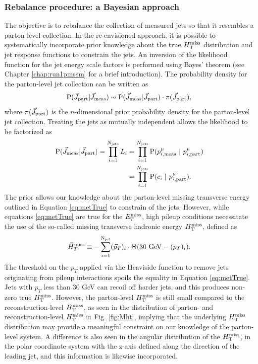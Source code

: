 \subsubsection{Rebalance procedure: a Bayesian approach}
The objective is to rebalance the collection of measured jets so that it resembles a parton-level collection. In the re-envisioned approach,  it is possible to systematically  incorporate prior knowledge about the true $H_{\text{T}}^{\rm miss}$ distribution and jet response functions to constrain the jets.  An inversion of the likelihood function for the jet energy scale factors is performed using Bayes' theorem (see Chapter \ref{chap:run1pmssm} for a brief introduction). The probability density for the parton-level jet collection can be written as
\begin{equation}
{\rm P}(\vec{J}_{\rm part}|\vec{J}_{\rm meas}) \sim {\rm P}(\vec{J}_{\rm meas}|\vec{J}_{\rm part})\cdot \pi(\vec{J}_{\rm part}),
\label{eq:posterior1}
\end{equation}
where $\pi(\vec{J}_{\rm part})$ is the $n$-dimensional prior probability density for the parton-level jet collection.
Treating the jets as mutually independent allows the likelihood to be factorized as
\begin{align}
\begin{split}
{\rm P}(\vec{J}_{\rm meas}|\vec{J}_{\rm part}) = \prod_{i=1}^{N_{\rm jets}}L_{i} &= \prod_{i=1}^{N_{\rm jets}}{\rm P}(p^{\mu}_{i,\rm meas}\ |\ p^{\mu}_{i,\rm part})\\
&=\prod_{i=1}^{N_{\rm jets}}{\rm P}(c_i\ |\ p^{\mu}_{i,\rm part}).
\end{split}
\label{eq:likelihood1}
\end{align}
The prior allows our knowledge about the parton-level missing transverse energy outlined in Equation \ref{eq:metTrue} to constrain of the jets. However, while equations \ref{eq:metTrue} are true for the $E_{T}^{\rm miss}$, high pileup conditions necessitate the use of the so-called missing transverse hadronic energy $H_{\text{T}}^{\rm miss}$, defined as
\begin{equation}
\vec{H}_{T}^{\rm miss} \equiv -\sum_{i=1}^{{\rm N}_{\rm jet}}(\vec{p}_{T})_{i}\cdot\Theta(30{\rm\ GeV}-(p_{T})_{i}).
\end{equation}
The threshold on the $p_{T}$ applied via the Heaviside function to remove jets originating from pileup interactions spoils the equality in Equation \ref{eq:metTrue}. Jets with $p_{T}$ less than 30 GeV can recoil off harder jets, and this produces non-zero true $H_{\text{T}}^{\rm miss}$. However, the parton-level $H_{\text{T}}^{\rm miss}$ is still small compared to the reconstruction-level $H_{\text{T}}^{\rm miss}$, as seen in the distribution of parton- and reconstruction-level $H_{\text{T}}^{\rm miss}$ in Fig. \ref{fig:Mht}, implying that the underlying $H_{\text{T}}^{\rm miss}$ distribution may provide a meaningful constraint on our knowledge of the parton-level system. A difference is also seen in the angular distribution of the $H_{\text{T}}^{\rm miss}$, in the polar coordinate system with the z-axis defined along the direction of the leading jet, and this information is likewise incorporated.

